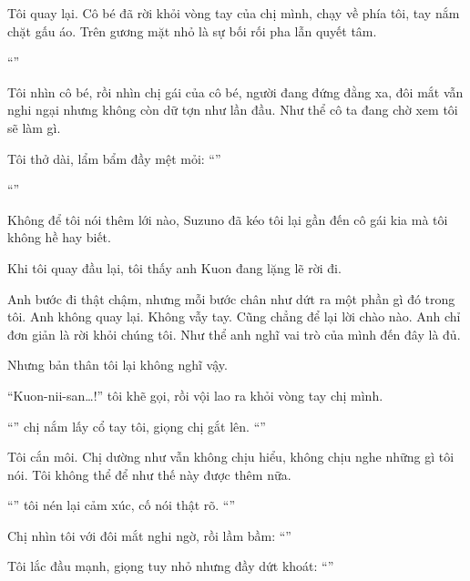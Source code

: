 \documentclass[../main.tex]{subfiles}
\begin{document}
Tôi quay lại. Cô bé đã rời khỏi vòng tay của chị mình, chạy về phía tôi, tay nắm chặt gấu áo. Trên gương mặt nhỏ là sự bối rối pha lẫn quyết tâm.

``''

Tôi nhìn cô bé, rồi nhìn chị gái của cô bé, người đang đứng đằng xa, đôi mắt vẫn nghi ngại nhưng không còn dữ tợn như lần đầu. Như thể cô ta đang chờ xem tôi sẽ làm gì.

Tôi thở dài, lẩm bẩm đầy mệt mỏi: ``''

``''

Không để tôi nói thêm lới nào, Suzuno đã kéo tôi lại gần đến cô gái kia mà tôi không hề hay biết.


Khi tôi quay đầu lại, tôi thấy anh Kuon đang lặng lẽ rời đi.

Anh bước đi thật chậm, nhưng mỗi bước chân như dứt ra một phần gì đó trong tôi. Anh không quay lại. Không vẫy tay. Cũng chẳng để lại lời chào nào. Anh chỉ đơn giản là rời khỏi chúng tôi. Như thể anh nghĩ vai trò của mình đến đây là đủ.

Nhưng bản thân tôi lại không nghĩ vậy.

``Kuon-nii-san\dots!'' tôi khẽ gọi, rồi vội lao ra khỏi vòng tay chị mình.

``'' chị nắm lấy cổ tay tôi, giọng chị gắt lên. ``''

Tôi cắn môi. Chị dường như vẫn không chịu hiểu, không chịu nghe những gì tôi nói. Tôi không thể để như thế này được thêm nữa.

``'' tôi nén lại cảm xúc, cố nói thật rõ. ``''

Chị nhìn tôi với đôi mắt nghi ngờ, rồi lầm bầm: ``''

Tôi lắc đầu mạnh, giọng tuy nhỏ nhưng đầy dứt khoát: ``''
\end{document}
